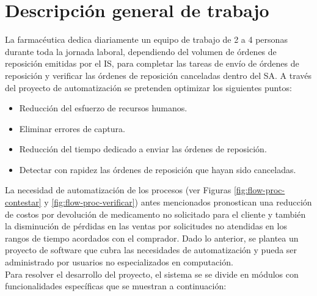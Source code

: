 \documentclass[letterpaper,11pt]{article}
\begin{document}
\section{Descripción general de trabajo}
La farmacéutica dedica diariamente un equipo de trabajo de 2 a 4 personas durante toda la jornada laboral, dependiendo del volumen de órdenes de reposición emitidas por el IS, para completar las tareas de envío de órdenes de reposición y verificar las órdenes de reposición canceladas dentro del SA. A través del proyecto de automatización se pretenden optimizar los siguientes puntos:
\begin{itemize}
\item Reducción del esfuerzo de recursos humanos.
\item Eliminar errores de captura.
\item Reducción del tiempo dedicado a enviar las órdenes de reposición.
\item Detectar con rapidez las órdenes de reposición que hayan sido canceladas.
\end{itemize}
La necesidad de automatización de los procesos (ver Figuras \ref{fig:flow-proc-contestar} y \ref{fig:flow-proc-verificar}) antes mencionados pronostican una reducción de costos por devolución de medicamento no solicitado para el cliente y también la disminución de pérdidas en las ventas por solicitudes no atendidas en los rangos de tiempo acordados con el comprador. Dado lo anterior, se plantea un proyecto de software que cubra las necesidades de automatización y pueda ser administrado por usuarios no especializados en computación.\\
Para resolver el desarrollo del proyecto, el sistema se se divide en módulos con funcionalidades específicas que se muestran a continuación:
\end{document}
